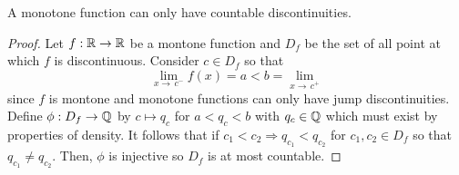 \documentclass{exam}
\begin{document}
\begin{theorem}
    A monotone function can only have countable discontinuities.
\end{theorem}
\begin{proof}
    Let $f: \mathbb R \to \mathbb R$ be a montone function and $D_f$ be the set of all point at which $f$ is discontinuous. Consider $c \in D_f$ so that 
    \[
        \lim_{x\to\,c^{-}} f(x) = a < b = \lim_{x\to\,c^{+}}
    \]
    since $f$ is montone and monotone functions can only have jump discontinuities. Define $\phi: D_f \to \mathbb Q$ by $c \mapsto q_c$ for $a < q_c < b$ with $q_c \in \mathbb Q$ which must exist by properties of density. It follows that if $c_1 < c_2 \Rightarrow q_{c_1} < q_{c_2}$ for $c_1, c_2 \in D_f$ so that $q_{c_1} \neq q_{c_2}$. Then, $\phi$ is injective so $D_f$ is at most countable.
\end{proof}
\end{document}
